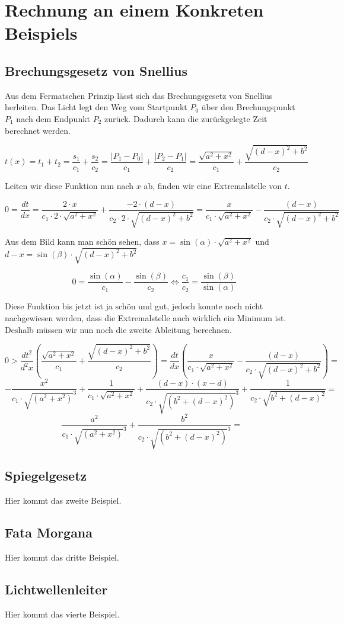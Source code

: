 \section{Rechnung an einem Konkreten Beispiels}

\subsection{Brechungsgesetz von Snellius}
Aus dem Fermatschen Prinzip lässt sich das Brechungsgesetz von Snellius herleiten.
Das Licht legt den Weg vom Startpunkt $P_0$ über den Brechungspunkt $P_1$ 
nach dem Endpunkt $P_2$ zurück. Dadurch kann die zurückgelegte Zeit berechnet werden.



\[
t(x) =
t_1 + t_2 =
\frac{s_1}{c_1} + \frac{s_2}{c_2} =
\frac{|P_1 - P_0|}{c_1} + \frac{|P_2 - P_1|}{c_2} =
\frac{\sqrt{a^2 + x^2}}{c_1} + \frac{\sqrt{(d-x)^2 + b^2}}{c_2}
\]

Leiten wir diese Funktion nun nach $x$ ab, finden wir eine Extremalstelle von $t$.

\[
0 = 
\frac{dt}{dx} =
\frac{2 \cdot x}{c_1 \cdot 2 \cdot \sqrt{a^2 + x^2}} + 
\frac{-2 \cdot (d-x)}{c_2 \cdot 2 \cdot \sqrt{(d-x)^2 + b^2}} =
\frac{x}{c_1 \cdot \sqrt{a^2 + x^2}} - 
\frac{(d-x)}{c_2 \cdot \sqrt{(d-x)^2 + b^2}}
\]

Aus dem Bild kann man schön sehen, dass $x = \sin(\alpha) \cdot \sqrt{a^2 + x^2}$
und $d-x = \sin(\beta) \cdot \sqrt{(d -x)^2 + b^2}$

\[
0 = 
\frac{\sin(\alpha)}{c_1} - \frac{\sin(\beta)}{c_2} \Leftrightarrow
\frac{c_1}{c_2} = \frac{\sin(\beta)}{\sin(\alpha)}
\]

Diese Funktion bis jetzt ist ja schön und gut, 
jedoch konnte noch nicht nachgewiesen werden, 
dass die Extremalstelle auch wirklich ein Minimum ist. 
Deshalb müssen wir nun noch die zweite Ableitung berechnen.

\[
0 > 
\frac{dt^2}{d^2x} \left(\frac{\sqrt{a^2 + x^2}}{c_1} + 
\frac{\sqrt{(d-x)^2 + b^2}}{c_2}\right) =
\frac{dt}{dx} \left(\frac{x}{c_1 \cdot \sqrt{a^2 + x^2}} - 
\frac{(d-x)}{c_2 \cdot \sqrt{(d-x)^2 + b^2}} \right) = \phantom a
\]
\[
- \frac{x^2}{c_1 \cdot \sqrt{(a^2 + x^2)}^{3}}
+ \frac{1}{c_1 \cdot \sqrt{a^2 + x^2}}
+ \frac{(d-x)\cdot(x-d)}{c_2 \cdot \sqrt{(b^2 + (d - x)^2)}^{3}}
+ \frac{1}{c_2 \cdot \sqrt{b^2 + (d-x)^2}} = \phantom a
\]
\[
\frac{a^2}{c_1 \cdot \sqrt{(a^2 + x^2)}^{3}}
+ \frac{b^2}{c_2 \cdot \sqrt{(b^2 + (d - x)^2)}^{3}} = \phantom a
\]

\subsection{Spiegelgesetz}
Hier kommt das zweite Beispiel.

\subsection{Fata Morgana}
Hier kommt das dritte Beispiel.

\subsection{Lichtwellenleiter}
Hier kommt das vierte Beispiel.